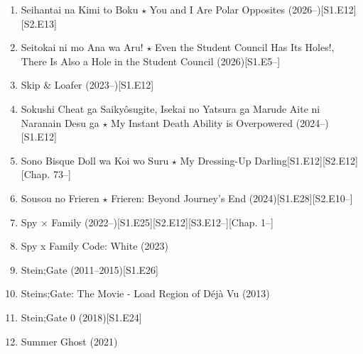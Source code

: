 \documentclass{article}
\begin{document}
\begin{enumerate}
	\item {\sc Seihantai na Kimi to Boku $\star$ You and I Are Polar Opposites} (2026--)\hfill[S1.E12][S2.E13]
	\item Seitokai ni mo Ana wa Aru! $\star$ Even the Student Council Has Its Holes!, There Is Also a Hole in the Student Council (2026)\hfill[S1.E5--]
	\item {\sc Skip \& Loafer} (2023--)\hfill[S1.E12]
	\item {\sc Sokushi Cheat ga Saikyôsugite, Isekai no Yatsura ga Marude Aite ni Naranain Desu ga $\star$ My Instant Death Ability is Overpowered} (2024--)\hfill[S1.E12]
    \item {\sc Sono Bisque Doll wa Koi wo Suru $\star$ My Dressing-Up Darling}\hfill[S1.E12][S2.E12][Chap. 73--]
    \item {\sc Sousou no Frieren $\star$ Frieren: Beyond Journey's End} (2024)\hfill[S1.E28][S2.E10--]
    \item {\sc Spy $\times$ Family} (2022--)\hfill[S1.E25][S2.E12][S3.E12--][Chap. 1--]
    \item {\sc Spy x Family Code: White} (2023)
    \item {\sc Stein;Gate} (2011--2015)\hfill[S1.E26]
    \item {\sc Steins;Gate: The Movie - Load Region of Déjà Vu} (2013)
    \item {\sc Stein;Gate 0} (2018)\hfill[S1.E24]
    \item {\sc Summer Ghost} (2021)


\end{enumerate}
\end{document}
